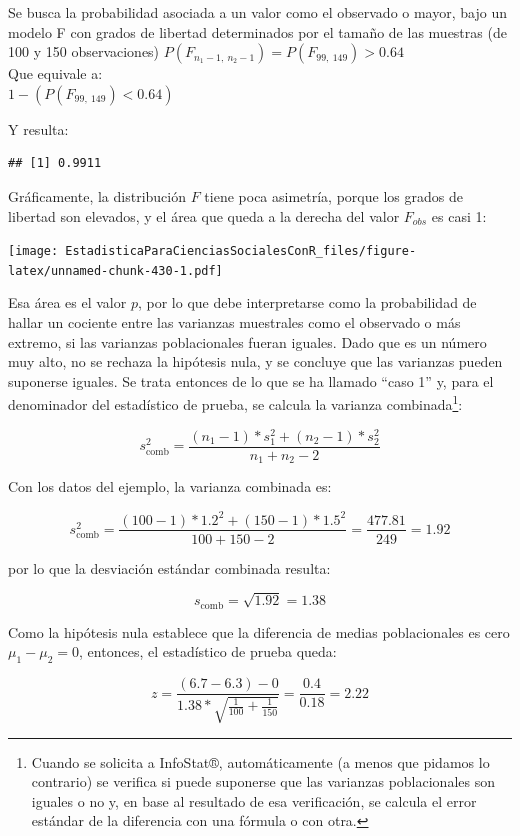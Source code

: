 \documentclass[]{book}
\let\rmarkdownfootnote\footnote%
\def\footnote{\protect\rmarkdownfootnote}
\begin{document}
Se busca la probabilidad asociada a un valor como el
observado o mayor, bajo un modelo F con grados de libertad determinados por el tamaño de las muestras (de 100 y 150 observaciones)
\(P(F_{n_{1} - 1,\ n_{2} - 1}) = P(F_{99,\ 149})>0.64\)\\
Que equivale a:\\
\(1-(P(F_{99,\ 149})<0.64)\)

Y resulta:

\begin{verbatim}
## [1] 0.9911
\end{verbatim}

Gráficamente, la distribución \(F\) tiene poca asimetría, porque los grados de libertad son elevados, y el área que queda a la derecha del valor \(F_{obs}\) es casi 1:

\texttt{[image: EstadisticaParaCienciasSocialesConR\_files/figure-latex/unnamed-chunk-430-1.pdf]}

Esa área es el valor \(p\), por lo que debe interpretarse como la probabilidad de hallar un cociente entre las varianzas muestrales como el observado o más extremo, si las varianzas poblacionales fueran iguales. Dado que es un número muy alto, no se rechaza la hipótesis nula, y se concluye que las varianzas pueden suponerse iguales. Se trata entonces de lo que se ha llamado ``caso 1'' y, para el denominador del estadístico de prueba, se calcula la varianza combinada\footnote{Cuando se solicita a InfoStat®, automáticamente (a menos que pidamos lo contrario) se verifica si puede suponerse que las varianzas poblacionales son iguales o no y, en base al resultado de esa verificación, se calcula el error estándar de la diferencia con una fórmula o con otra.}:

\[s_{\text{comb}}^{2} = \frac{\left( n_{1} - 1 \right)*s_{1}^{2} + \left( n_{2} - 1 \right)*s_{2}^{2}}{n_{1} + n_{2} - 2}\]

Con los datos del ejemplo, la varianza combinada es:

\[s_{\text{comb}}^{2} = \frac{\left( 100 - 1 \right)*{1.2}^{2} + \left( 150 - 1 \right)*{1.5}^{2}}{100 + 150 - 2} = \frac{477.81}{249} = 1.92\]

por lo que la desviación estándar combinada resulta:

\[s_{\text{comb}} = \sqrt{1.92} = 1.38\]

Como la hipótesis nula establece que la diferencia de medias
poblacionales es cero \(\mu_{1} - \mu_{2} = 0\), entonces, el estadístico
de prueba queda:

\[z = \frac{\left( 6.7 - 6.3 \right) - 0}{1.38*\sqrt{\frac{1}{100} + \frac{1}{150}}} = \frac{0.4}{0.18} = 2.22\]
\end{document}
